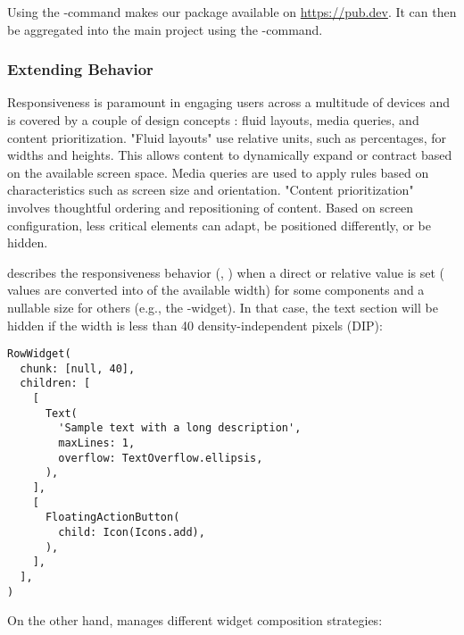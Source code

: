 \noindent Using the -command makes our package available on 
\href{https://pub.dev}{https://pub.dev}. It can then be aggregated into the main project using the 
-command.


\subsubsection{Extending Behavior}

Responsiveness is paramount in engaging users across a multitude of devices and is covered by a couple of design 
concepts \cite{Frai22}: fluid layouts, media queries, and content prioritization. "Fluid layouts" use relative units, 
such as percentages, for widths and heights. This allows content to dynamically expand or contract based on the 
available screen space. Media queries are used to apply rules based on characteristics such as screen size and 
orientation. "Content prioritization" involves thoughtful ordering and repositioning of content. Based on screen 
configuration, less critical elements can adapt, be positioned differently, or be hidden.

 describes the responsiveness behavior (, ) when a direct or 
relative value is set ( values are converted into  of the available width) for some 
components and a nullable size for others (e.g., the -widget). In that case, the text section will be hidden 
if the width is less than 40 density-independent pixels (DIP):

\begin{lstlisting}
RowWidget(
  chunk: [null, 40],
  children: [
    [
      Text(
        'Sample text with a long description', 
        maxLines: 1,
        overflow: TextOverflow.ellipsis,
      ),
    ],
    [
      FloatingActionButton(
        child: Icon(Icons.add),
      ),
    ],
  ],
)
\end{lstlisting}

\noindent On the other hand,  manages  different widget composition strategies: 

